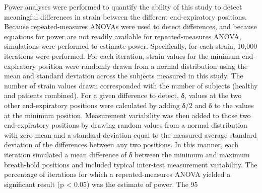 	Power analyses were performed to quantify the ability of this study to detect meaningful differences in strain between the different end-expiratory positions. Because repeated-measures ANOVAs were used to detect differences, and because equations for power are not readily available for repeated-measures ANOVA, simulations were performed to estimate power. Specifically, for each strain, 10,000 iterations were performed. For each iteration, strain values for the minimum end-expiratory position were randomly drawn from a normal distribution using the mean and standard deviation across the subjects measured in this study.  The number of strain values drawn corresponded with the number of subjects (healthy and patients combined). For a given difference to detect, δ, values at the two other end-expiratory positions were calculated by adding δ/2 and δ to the values at the minimum position. Measurement variability was then added to those two end-expiratory positions by drawing random values from a normal distribution with zero mean and a standard deviation equal to the measured average standard deviation of the differences between any two positions. In this manner, each iteration simulated a mean difference of δ between the minimum and maximum breath-hold positions and included typical inter-test measurement variability. The percentage of iterations for which a repeated-measures ANOVA yielded a significant result (p < 0.05) was the estimate of power. The 95%
	
	

